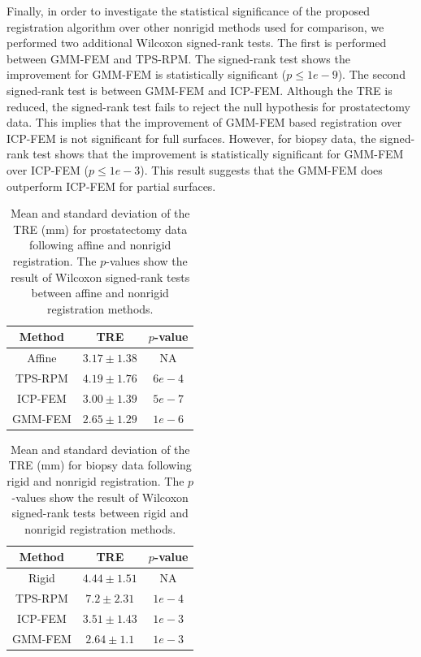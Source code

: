 \documentclass[journal]{IEEEtran}
\begin{document}
Finally, in order to investigate the statistical significance of the proposed registration algorithm over other nonrigid methods used for comparison, we performed two additional Wilcoxon signed-rank tests. The first is performed between GMM-FEM and TPS-RPM. The signed-rank test shows the improvement for GMM-FEM is statistically significant ($p\leq1e-9$). The second signed-rank test is between GMM-FEM and ICP-FEM. Although the TRE is reduced, the signed-rank test fails to reject the null hypothesis for prostatectomy data. This implies that the improvement of GMM-FEM based registration over ICP-FEM is not significant for full surfaces. However, for biopsy data, the signed-rank test shows that the improvement is statistically significant for GMM-FEM over ICP-FEM ($p\leq1e-3$). This result suggests that the GMM-FEM does outperform ICP-FEM for partial surfaces.
\begin{table}[tb]
\begin{center}
\caption{Mean and standard deviation of the TRE (mm) for prostatectomy data following affine and nonrigid registration. The $p$-values show the result of Wilcoxon signed-rank tests between affine and nonrigid registration methods.}
\centering
\begin{tabular}{c| c| c}
	\hline
	Method & TRE & $p$-value\\
	\hline
	Affine & $3.17 \pm 1.38$ & NA \\
	\hline
	TPS-RPM & $4.19 \pm 1.76$ & $6e-4$ \\
	\hline
	ICP-FEM & $3.00 \pm 1.39$ & $5e-7$ \\
	\hline
	GMM-FEM & $2.65 \pm 1.29$ & $1e-6$ \\
   \hline
\end{tabular}
\label{tab:exp2Res1}
\end{center}
\end{table}
\begin{table}[tb]
\begin{center}
\caption{Mean and standard deviation of the TRE (mm) for biopsy data following rigid and nonrigid registration. The $p$-values show the result of Wilcoxon signed-rank tests between rigid and nonrigid registration methods.}
\centering
\begin{tabular}{c| c| c}
	\hline
	Method & TRE & $p$-value\\
	\hline
	Rigid & $4.44 \pm 1.51$ & NA \\
	\hline
	TPS-RPM & $7.2 \pm 2.31$ & $1e-4$ \\
	\hline
	ICP-FEM & $3.51 \pm 1.43$ & $1e-3$ \\
	\hline
	GMM-FEM & $2.64 \pm 1.1$ & $1e-3$ \\
   \hline
\end{tabular}
\label{tab:exp1Res1}
\end{center}
\end{table}
\end{document}
